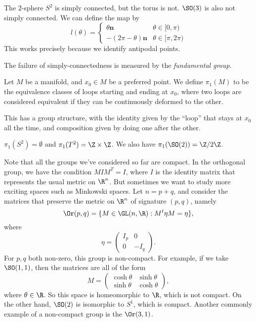 \documentclass[a4paper]{article}
\begin{document}
\begin{eg}
  The $2$-sphere $S^2$ is simply connected, but the torus is not. $\SO(3)$ is also not simply connected. We can define the map by
  \[
    l(\theta) =
    \begin{cases}
      \theta \mathbf{n} & \theta \in [0, \pi)\\
      -(2\pi - \theta) \mathbf{n} & \theta \in [\pi, 2\pi)
    \end{cases}
  \]
  This works precisely because we identify antipodal points.
\end{eg}

The failure of simply-connectedness is measured by the \emph{fundamental group}.
\begin{defi}
  Let $M$ be a manifold, and $x_0 \in M$ be a preferred point. We define $\pi_1(M)$ to be the equivalence classes of loops starting and ending at $x_0$, where two loops are considered equivalent if they can be continuously deformed to the other.

  This has a group structure, with the identity given by the ``loop'' that stays at $x_0$ all the time, and composition given by doing one after the other.
\end{defi}

\begin{eg}
  $\pi_1(S^2) = \emptyset$ and $\pi_1(T^2) = \Z \times \Z$. We also have $\pi_1(\SO(2)) = \Z/2\Z$.
\end{eg}

Note that all the groups we've considered so far are compact. In the orthogonal group, we have the condition $MIM^T = I$, where $I$ is the identity matrix that represents the usual metric on $\R^n$. But sometimes we want to study more exciting spaces such as Minkowski spaces. Let $n = p + q$, and consider the matrices that preserve the metric on $\R^n$ of signature $(p, q)$, namely
\[
  \Or(p, q) = \{M \in \GL(n, \R): M^t \eta M = \eta\},
\]
where
\[
  \eta =
  \begin{pmatrix}
    I_p & 0\\
    0 & -I_q
  \end{pmatrix}.
\]
For $p, q$ both non-zero, this group is non-compact. For example, if we take $\SO(1, 1)$, then the matrices are all of the form
\[
  M =
  \begin{pmatrix}
    \cosh\theta & \sinh \theta\\
    \sinh \theta & \cosh \theta
  \end{pmatrix},
\]
where $\theta \in \R$. So this space is homeomorphic to $\R$, which is not compact. On the other hand, $\SO(2)$ is isomorphic to $S^1$, which is compact. Another commonly example of a non-compact group is the  $\Or(3, 1)$.
\end{document}
